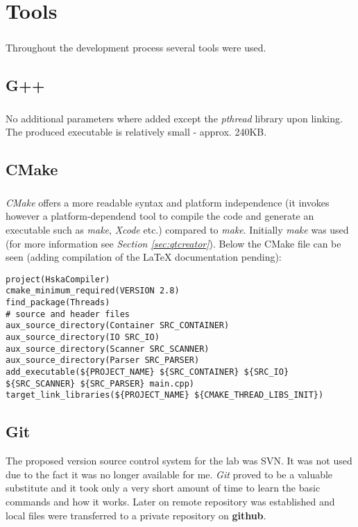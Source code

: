 \chapter{Tools}
\paragraph{}
	Throughout the development process several tools were used.
	\section{G++}
	\paragraph{}
		No additional parameters where added except the \textit{pthread} library upon linking. The produced executable is relatively small - approx. 240KB.
	\section{CMake}
	\paragraph{}
		\textit{CMake} offers a more readable syntax and platform independence (it invokes however a platform-dependend tool to compile the code and generate an executable such as \textit{make}, \textit{Xcode} etc.) compared to \textit{make}. Initially \textit{make} was used (for more information see \textit{Section \ref{sec:qtcreator}}). Below the CMake file can be seen (adding compilation of the LaTeX documentation pending):
		\begin{lstlisting}[frame=single]
project(HskaCompiler)
cmake_minimum_required(VERSION 2.8)
find_package(Threads)
# source and header files
aux_source_directory(Container SRC_CONTAINER)
aux_source_directory(IO SRC_IO)
aux_source_directory(Scanner SRC_SCANNER)
aux_source_directory(Parser SRC_PARSER)
add_executable(${PROJECT_NAME} ${SRC_CONTAINER} ${SRC_IO} ${SRC_SCANNER} ${SRC_PARSER} main.cpp)
target_link_libraries(${PROJECT_NAME} ${CMAKE_THREAD_LIBS_INIT})
		\end{lstlisting}
	\section{Git}
		The proposed version source control system for the lab was SVN. It was not used due to the fact it was no longer available for me. \textit{Git} proved to be a valuable substitute and it took only a very short amount of time to learn the basic commands and how it works. Later on remote repository was established and local files were transferred to a private repository on \textbf{github}.
